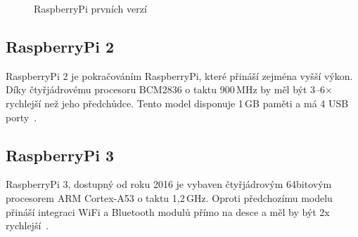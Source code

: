\begin{figure}[!ht]
    \centering
			\hspace*{2mm}
			\hspace*{2mm}
		\caption{RaspberryPi prvních verzí}
		\vspace{-20pt}	
\end{figure}
	
	\subsection{RaspberryPi 2}
	RaspberryPi 2 je pokračováním RaspberryPi, které přináší zejména vyšší výkon. Díky čtyřjádrovému procesoru BCM2836 o taktu 900\,MHz by měl být 3–6× rychlejší než jeho předchůdce. Tento model disponuje 1\,GB paměti a má 4 USB porty~\cite{RaspiTwo}.


\subsection{RaspberryPi 3}
		RaspberryPi 3, dostupný od roku 2016 je vybaven čtyřjádrovým 64bitovým procesorem ARM Cortex-A53 o taktu 1,2\,GHz. Oproti předchozímu modelu přináší integraci WiFi a Bluetooth modulů přímo na desce a měl by být 2x rychlejší~\cite{RaspiThree}.
		
